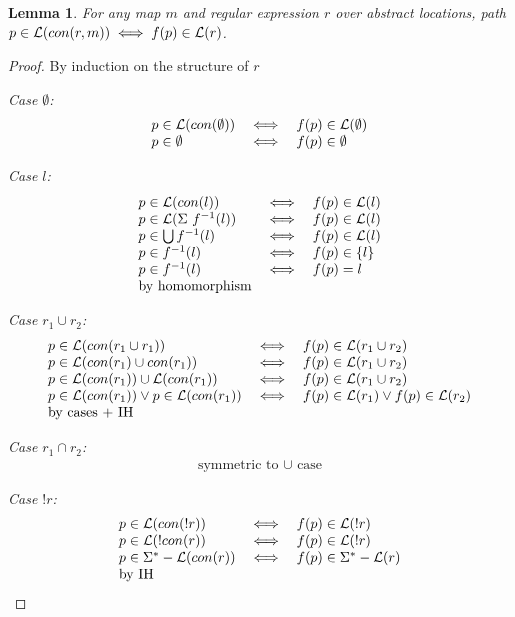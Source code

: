 \documentclass[twocolumn]{sig-alternate-10pt}
\newtheorem{lem}[thm]{Lemma}
\begin{document}
\begin{lem}
  For any map $m$ and regular expression $r$ over abstract locations, path $p \in \mathcal{L}(con(r,m)) \iff f(p) \in \mathcal{L}(r)$.
\end{lem}
\begin{proof}
By induction on the structure of $r$

\emph{Case $\emptyset$:}
  \[ \begin{array}{lll}
    p \in \mathcal{L}(con(\emptyset)) &\iff& f(p) \in \mathcal{L}(\emptyset) \\
    p \in \emptyset &\iff& f(p) \in \emptyset \\
  \end{array} \]

\emph{Case $l$:}
  \[ \begin{array}{lll}
    p \in \mathcal{L}(con(l)) &\iff& f(p) \in \mathcal{L}(l) \\
    p \in \mathcal{L}(\Sigma ~ f^{-1}(l)) &\iff& f(p) \in \mathcal{L}(l) \\
    p \in \bigcup f^{-1}(l) &\iff& f(p) \in \mathcal{L}(l) \\
    p \in f^{-1}(l) &\iff& f(p) \in \{ l \} \\
    p \in f^{-1}(l) &\iff& f(p) = l \\
    \text{by homomorphism} & & \\
  \end{array} \]

\emph{Case $r_1 \cup r_2$:}
  \[ \begin{array}{lll}
    p \in \mathcal{L}(con(r_1 \cup r_1)) &\iff& f(p) \in \mathcal{L}(r_1 \cup r_2) \\
    p \in \mathcal{L}(con(r_1) \cup con(r_1)) &\iff& f(p) \in \mathcal{L}(r_1 \cup r_2) \\
    p \in \mathcal{L}(con(r_1)) \cup \mathcal{L}(con(r_1)) &\iff& f(p) \in \mathcal{L}(r_1 \cup r_2) \\
    p \in \mathcal{L}(con(r_1)) \vee p \in \mathcal{L}(con(r_1)) 
       &\iff& 
       f(p) \in \mathcal{L}(r_1) \vee f(p) \in \mathcal{L}(r_2) \\
    \text{by cases + IH} & & \\
  \end{array} \]

\emph{Case $r_1 \cap r_2$:} 
  \[ \begin{array}{c}
    \text{symmetric to } \cup \text{ case}
  \end{array} \]

\emph{Case $!r$:}
  \[ \begin{array}{lll}
    p \in \mathcal{L}(con(!r)) &\iff& f(p) \in \mathcal{L}(!r) \\
    p \in \mathcal{L}(!con(r)) &\iff& f(p) \in \mathcal{L}(!r) \\
    p \in \Sigma^* - \mathcal{L}(con(r)) &\iff& f(p) \in \Sigma^* - \mathcal{L}(r) \\
    \text{by IH} & & \\
  \end{array} \]


\end{proof}
\end{document}
